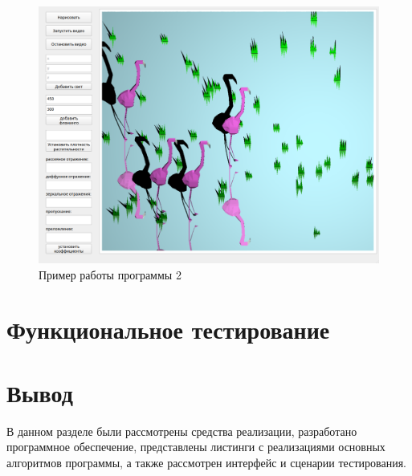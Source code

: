 \begin{figure}[h!]
	\centering
	\includegraphics[width=0.9\linewidth]{img/ex2}
	\caption{Пример работы программы 2}
	\label{fig:ex2}
\end{figure}
\clearpage

\section{Функциональное тестирование}

\section{Вывод}

В данном разделе были рассмотрены средства реализации, разработано программное обеспечение, представлены листинги с реализациями основных алгоритмов программы, а также рассмотрен интерфейс и сценарии тестирования.